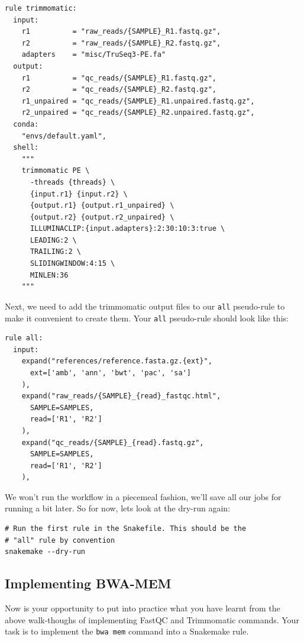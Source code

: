 \begin{lstlisting}
rule trimmomatic:
  input:
    r1          = "raw_reads/{SAMPLE}_R1.fastq.gz",
    r2          = "raw_reads/{SAMPLE}_R2.fastq.gz",
    adapters    = "misc/TruSeq3-PE.fa"
  output:
    r1          = "qc_reads/{SAMPLE}_R1.fastq.gz",
    r2          = "qc_reads/{SAMPLE}_R2.fastq.gz",
    r1_unpaired = "qc_reads/{SAMPLE}_R1.unpaired.fastq.gz",
    r2_unpaired = "qc_reads/{SAMPLE}_R2.unpaired.fastq.gz",
  conda:
    "envs/default.yaml",
  shell:
    """
    trimmomatic PE \
      -threads {threads} \
      {input.r1} {input.r2} \
      {output.r1} {output.r1_unpaired} \
      {output.r2} {output.r2_unpaired} \
      ILLUMINACLIP:{input.adapters}:2:30:10:3:true \
      LEADING:2 \
      TRAILING:2 \
      SLIDINGWINDOW:4:15 \
      MINLEN:36
    """
\end{lstlisting}

Next, we need to add the trimmomatic output files to our \texttt{all} pseudo-rule to make it convenient to create them.
Your \texttt{all} pseudo-rule should look like this:

\begin{lstlisting}
rule all:
  input:
    expand("references/reference.fasta.gz.{ext}",
      ext=['amb', 'ann', 'bwt', 'pac', 'sa']
    ),
    expand("raw_reads/{SAMPLE}_{read}_fastqc.html",
      SAMPLE=SAMPLES,
      read=['R1', 'R2']
    ),
    expand("qc_reads/{SAMPLE}_{read}.fastq.gz",
      SAMPLE=SAMPLES,
      read=['R1', 'R2']
    ),
\end{lstlisting}

We won't run the workflow in a piecemeal fashion, we'll save all our jobs for running a bit later.
So for now, lets look at the dry-run again:

\begin{lstlisting}
# Run the first rule in the Snakefile. This should be the
# "all" rule by convention
snakemake --dry-run
\end{lstlisting}

\subsection{Implementing BWA-MEM}

Now is your opportunity to put into practice what you have learnt from the above walk-thoughs of implementing FastQC and Trimmomatic commands.
Your task is to implement the \texttt{bwa mem} command into a Snakemake rule.


